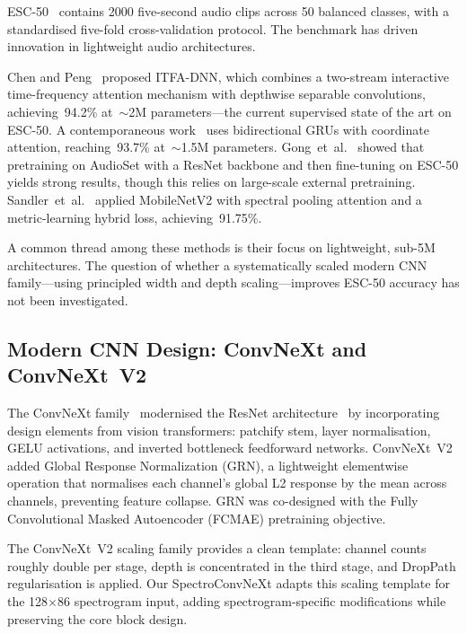 \documentclass{article}
\begin{document}
ESC-50~\cite{piczark2015esc50} contains 2000 five-second audio clips across 50
balanced classes, with a standardised five-fold cross-validation protocol. The
benchmark has driven innovation in lightweight audio architectures.

Chen and Peng~\cite{chen2025itfa} proposed ITFA-DNN, which combines a
two-stream interactive time-frequency attention mechanism with depthwise
separable convolutions, achieving~94.2\% at~$\sim$2M parameters---the current
supervised state of the art on ESC-50. A contemporaneous
work~\cite{crnncoordatt2026} uses bidirectional GRUs with coordinate
attention, reaching~93.7\% at~$\sim$1.5M parameters. Gong~et~al.~\cite{gong2021psla}
showed that pretraining on AudioSet with a ResNet backbone and then fine-tuning
on ESC-50 yields strong results, though this relies on large-scale external
pretraining. Sandler~et~al.~\cite{mobilenetv2spa2025} applied MobileNetV2 with
spectral pooling attention and a metric-learning hybrid loss, achieving~91.75\%.

A common thread among these methods is their focus on lightweight, sub-5M
architectures. The question of whether a systematically scaled modern CNN
family---using principled width and depth scaling---improves ESC-50 accuracy has
not been investigated.

\subsection{Modern CNN Design: ConvNeXt and ConvNeXt~V2}

The ConvNeXt family~\cite{liu2022convnext} modernised the ResNet architecture~\cite{he2016resnet}
by incorporating design elements from vision transformers: patchify stem, layer
normalisation, GELU activations, and inverted bottleneck feedforward networks.
ConvNeXt~V2~\cite{woo2023convnextv2} added Global Response Normalization
(GRN), a lightweight elementwise operation that normalises each channel's global
L2 response by the mean across channels, preventing feature collapse. GRN was
co-designed with the Fully Convolutional Masked Autoencoder (FCMAE) pretraining
objective.

The ConvNeXt~V2 scaling family provides a clean template: channel counts roughly
double per stage, depth is concentrated in the third stage, and DropPath
regularisation is applied. Our SpectroConvNeXt adapts this scaling template for
the 128$\times$86 spectrogram input, adding spectrogram-specific modifications
while preserving the core block design.
\end{document}
